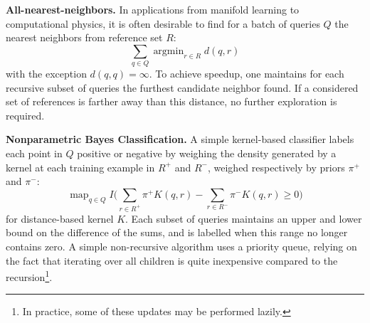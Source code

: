 \documentclass{article}
\DeclareMathOperator*{\argmin}{argmin}
\DeclareMathOperator*{\map}{map}
\newcommand{\spos}{^{{\scriptscriptstyle +\!}}}
\newcommand{\sneg}{^{{\scriptscriptstyle -\!}}}
\begin{document}
{\bf All-nearest-neighbors.} In applications from manifold learning to computational physics, it is often desirable to find for a batch of queries $Q$ the nearest neighbors from reference set $R$:
\begin{equation*}
\sum_{q \in Q} \argmin_{r \in R} d(q,r)
\end{equation*}
\noindent with the exception $d(q,q) = \infty$.
To achieve speedup, one maintains for each recursive subset of queries the furthest candidate neighbor found.
If a considered set of references is farther away than this distance, no further exploration is required.

{\bf Nonparametric Bayes Classification.}
A simple kernel-based classifier labels each point in $Q$ positive or negative by weighing the density generated by a kernel at each training example in $R\spos$ and $R\sneg$, weighed respectively by priors $\pi\spos$ and $\pi\sneg$:
\begin{equation*}
\map_{q \in Q} I\Big(\sum_{r \in R\spos} \pi\spos K(q,r) - \sum_{r \in R\sneg} \pi\sneg K(q,r) \geq 0 \Big)
\end{equation*}
\noindent for distance-based kernel $K$.
Each subset of queries maintains an upper and lower bound on the difference of the sums, and is labelled when this range no longer contains zero.
A simple non-recursive algorithm uses a priority queue, relying on the fact that iterating over all children is quite inexpensive compared to the recursion\footnote{In practice, some of these updates may be performed lazily.}.
\end{document}
